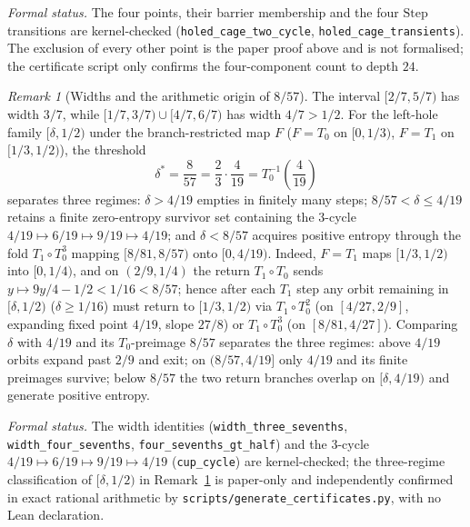 \documentclass[11pt,a4paper]{article}
\theoremstyle{remark}
\newtheorem{remark}[theorem]{Remark}
\begin{document}
\noindent\emph{Formal status.} The four points, their barrier membership and the four $\mathrm{Step}$ transitions are kernel-checked (\texttt{holed\_cage\_two\_cycle}, \texttt{holed\_cage\_transients}). The exclusion of every other point is the paper proof above and is not formalised; the certificate script only confirms the four-component count to depth $24$.

\begin{remark}[Widths and the arithmetic origin of $8/57$]
\label{rem:857}
The interval $[2/7,5/7)$ has width $3/7$, while $[1/7,3/7) \cup [4/7,6/7)$ has width $4/7 > 1/2$. For the left-hole family $[\delta,1/2)$ under the branch-restricted map $F$ ($F = T_{0}$ on $[0,1/3)$, $F = T_{1}$ on $[1/3,1/2)$), the threshold
\[
  \delta^{*} = \frac{8}{57} = \frac23 \cdot \frac{4}{19} = T_{0}^{-1}\!\left(\frac{4}{19}\right)
\]
separates three regimes: $\delta > 4/19$ empties in finitely many steps; $8/57 < \delta \le 4/19$ retains a finite zero-entropy survivor set containing the $3$-cycle $4/19 \mapsto 6/19 \mapsto 9/19 \mapsto 4/19$; and $\delta < 8/57$ acquires positive entropy through the fold $T_{1} \circ T_{0}^{3}$ mapping $[8/81,8/57)$ onto $[0,4/19)$. Indeed, $F = T_{1}$ maps $[1/3,1/2)$ into $[0,1/4)$, and on $(2/9,1/4)$ the return $T_{1} \circ T_{0}$ sends $y \mapsto 9y/4 - 1/2 < 1/16 < 8/57$; hence after each $T_{1}$ step any orbit remaining in $[\delta,1/2)$ ($\delta \ge 1/16$) must return to $[1/3,1/2)$ via $T_{1} \circ T_{0}^{2}$ (on $[4/27,2/9]$, expanding fixed point $4/19$, slope $27/8$) or $T_{1} \circ T_{0}^{3}$ (on $[8/81,4/27]$). Comparing $\delta$ with $4/19$ and its $T_{0}$-preimage $8/57$ separates the three regimes: above $4/19$ orbits expand past $2/9$ and exit; on $(8/57,4/19]$ only $4/19$ and its finite preimages survive; below $8/57$ the two return branches overlap on $[\delta,4/19)$ and generate positive entropy.
\end{remark}

\noindent\emph{Formal status.} The width identities (\texttt{width\_\allowbreak three\_\allowbreak sevenths}, \texttt{width\_\allowbreak four\_\allowbreak sevenths}, \texttt{four\_\allowbreak sevenths\_\allowbreak gt\_\allowbreak half}) and the $3$-cycle $4/19 \mapsto 6/19 \mapsto 9/19 \mapsto 4/19$ (\texttt{cup\_\allowbreak cycle}) are kernel-checked; the three-regime classification of $[\delta,1/2)$ in Remark~\ref{rem:857} is paper-only and independently confirmed in exact rational arithmetic by \texttt{scripts/\allowbreak generate\_\allowbreak certificates.py}, with no Lean declaration.
\end{document}

